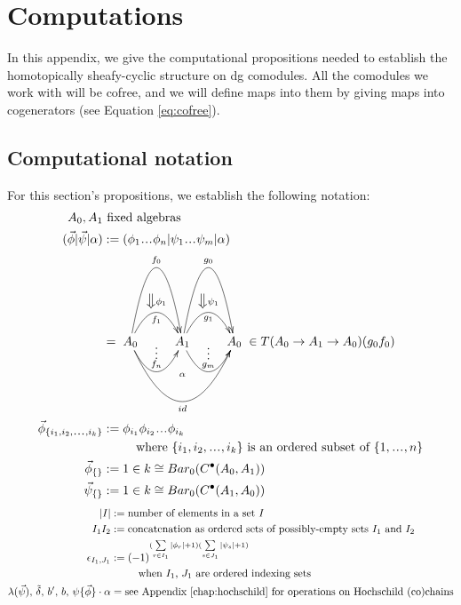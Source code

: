 \chapter{Computations}\label{chap:computations}
In this appendix, we give the 
computational propositions 
needed to establish the 
homotopically sheafy-cyclic structure 
on dg comodules. All the comodules we work 
with will be cofree, 
and we will define maps into them by 
giving maps into cogenerators 
(see Equation \ref{eq:cofree}).
%
\section{Computational notation} \label{sec:comp_notation_1}
For this section's propositions, we 
establish the following notation:
\begin{align*}
A_0, A_1 
&\textrm{ fixed algebras}\\
(\vec{\phi} | \vec{\psi} | \alpha) 
&:= 
(\phi_1\smdots\phi_n | \psi_1\smdots\psi_m| \alpha)\\
&= 
\xymatrix{
A_0 \ar@/^5pc/[r]^{f_0} 
\ar@/^2pc/[r]^{\big\Downarrow \phi_1}_{f_1} 
\ar@/_2pc/[r]^{\substack{\vdots\\ f_n}}
\ar@/_4pc/[rr]_{id}^{\substack{\alpha \\ \\ \\ \\ }}
& A_1 \ar@/^5pc/[r]^{g_0} 
\ar@/^2pc/[r]^{\big\Downarrow \psi_1}_{g_1} 
\ar@/_2pc/[r]^{\substack{\vdots\\ g_m}}
& A_0
}
\in T(A_0 \to A_1 \to A_0)(g_0f_0)\\
\vec{\phi}_{\{i_1, i_2,\smdots, i_k\}}
&:= 
\phi_{i_1}\phi_{i_2}\smdots\phi_{i_k}\\
&\phantom{{}move{}}
 \textrm{ where $\{i_1, i_2,\smdots, i_k\}$ 
 is an ordered subset of $\{1,\smdots,n\}$}\\
\vec{\phi}_{\{\}}
&:= 
1 \in k \cong Bar_0(C^\bullet(A_0, A_1))\\
\vec{\psi}_{\{\}}
&:= 
1 \in k \cong Bar_0(C^\bullet(A_1, A_0))
\end{align*}
\begin{align*}
|I| 
&:=
\textrm{number of elements in a set $I$}\\
I_1I_2 
&:= 
\textrm{concatenation as ordered sets 
of possibly-empty sets $I_1$ and $I_2$}\\
\epsilon_{I_1,J_1} 
&:= 
(-1)^{(\sum \limits_{r \in I_1}|\phi_r|+1)
  (\sum \limits_{s \in J_1}|\psi_s|+1) }\\
&\phantom{{}:={}}  
  \quad \textrm{when $I_1$, $J_1$ are 
  ordered indexing sets}\\
\lambda({\vec{\psi}}),\, \tilde{\delta},\, 
b^\prime,\, b,\, \psi\{\vec{\phi}\}\cdot \alpha
&=
\textrm{see Appendix \ref{chap:hochschild} 
for operations on Hochschild (co)chains}\\
\end{align*}
%
